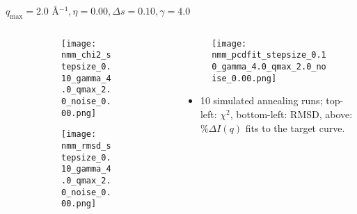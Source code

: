 \documentclass{beamer}
\begin{document}
\begin{frame}{$ q_{\textrm{max}}=2.0 $ \AA $^{-1}, \eta=0.00, \Delta s=0.10, \gamma=4.0$}
	\begin{columns}
		\begin{column}{.5\textwidth}
			\begin{figure}[H]
			\centering
			\begin{subfigure}[b]{\textwidth}
				\centering
				\texttt{[image: nmm\_chi2\_stepsize\_0.10\_gamma\_4.0\_qmax\_2.0\_noise\_0.00.png]}
				\label{fig:}
			\end{subfigure}
			\begin{subfigure}[b]{\textwidth}
				\centering
				\texttt{[image: nmm\_rmsd\_stepsize\_0.10\_gamma\_4.0\_qmax\_2.0\_noise\_0.00.png]}
				\label{fig:}
			\end{subfigure}
			\end{figure}
		\end{column}
		\begin{column}{.5\textwidth}
			\begin{figure}[H]
				\centering
				\texttt{[image: nmm\_pcdfit\_stepsize\_0.10\_gamma\_4.0\_qmax\_2.0\_noise\_0.00.png]}
				\label{fig:}
			\end{figure}
			\begin{itemize}
				\item 10 simulated annealing runs; top-left: $\chi^2$, bottom-left: RMSD, above: $\%\Delta I(q)$ fits to the target curve.
			\end{itemize}
		\end{column}
	\end{columns}
\end{frame}
 
\end{document}
